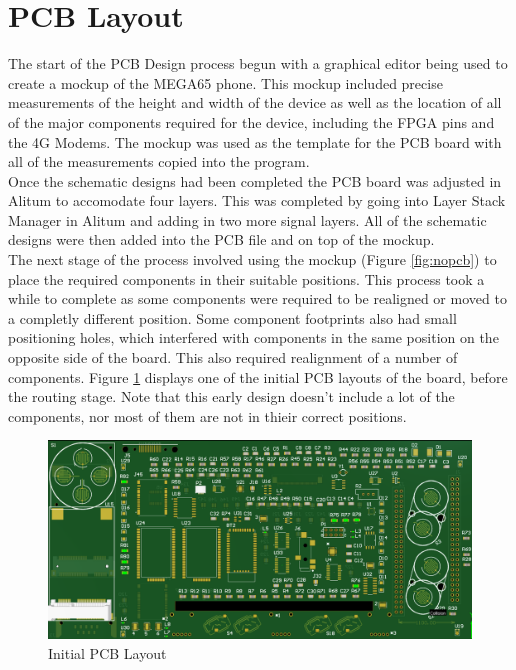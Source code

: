 \section{PCB Layout}

	The start of the PCB Design process begun with a graphical editor being used to create a mockup of the MEGA65 phone. This mockup included precise measurements of the height and width of the device as well as the location of all of the major components required for the device, including the FPGA pins and the 4G Modems. The mockup was used as the template for the PCB board with all of the measurements copied into the program. \\
	Once the schematic designs had been completed the PCB board was adjusted in Alitum to accomodate four layers. This was completed by going into Layer Stack Manager in Alitum and adding in two more signal layers. All of the schematic designs were then added into the PCB file and on top of the mockup. \\
The next stage of the process involved using the mockup (Figure \ref{fig:nopcb}) to place the required components in their suitable positions. This process took a while to complete as some components were required to be realigned or moved to a completly different position. Some component footprints also had small positioning holes, which interfered with components in the same position on the opposite side of the board. This also required realignment of a number of components. Figure \ref{fig:Initial_PCB} displays one of the initial PCB layouts of the board, before the routing stage. Note that this early design doesn't include a lot of the components, nor most of them are not in thieir correct positions.\\

\begin{figure}
	\includegraphics[width=\linewidth]{Figures/PCB.png}
	\caption{Initial PCB Layout}
	\label{fig:Initial_PCB}
\end{figure}

